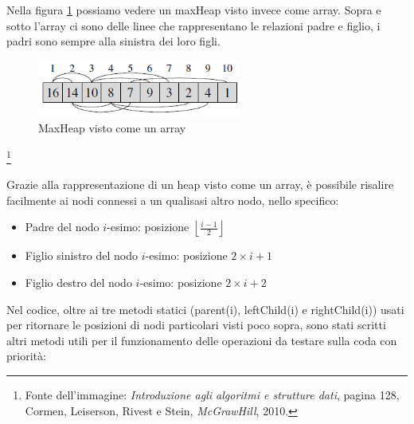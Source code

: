 \documentclass{article}
\begin{document}
Nella figura \ref{fig: Heap2} possiamo vedere un maxHeap visto invece come array. Sopra e sotto l'array ci sono delle linee che rappresentano le relazioni padre e figlio, i padri sono sempre alla sinistra dei loro figli.

\begin{figure}[H]
    \includegraphics[width=0.6\textwidth]{Images/Heap2.png}
    \centering
    \caption{MaxHeap visto come un array}
    \label{fig: Heap2}
\end{figure}

\footnote{Fonte dell'immagine: \textit{Introduzione agli algoritmi e strutture dati}, pagina 128, Cormen, Leiserson, Rivest e Stein, \emph{McGrawHill}, 2010.}

Grazie alla rappresentazione di un heap visto come un array, è possibile risalire facilmente ai nodi connessi a un qualisasi altro nodo, nello specifico:

\begin{itemize}
    
    \item Padre del nodo $i$-esimo: posizione $\left \lfloor{\frac{i-1}{2}}\right \rfloor$
    
    \item Figlio sinistro del nodo $i$-esimo: posizione $2\times i + 1$
    
    \item Figlio destro del nodo $i$-esimo: posizione $2\times i + 2$
\end{itemize}


Nel codice, oltre ai tre metodi statici (parent(i), leftChild(i) e rightChild(i)) usati per ritornare le posizioni di nodi particolari visti poco sopra, sono stati scritti altri metodi utili per il funzionamento delle operazioni da testare sulla coda con priorità:
\end{document}
